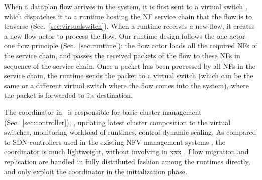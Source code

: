 When a dataplan flow arrives in the system, it is first sent to a virtual switch , which dispatches it to a runtime hosting the NF service chain that the flow is to traverse (Sec.~\ref{sec:virtualswitch}). When a runtime receives a new flow, it creates a new flow actor to process the flow. Our runtime design follows the one-actor-one flow principle (Sec.~\ref{sec:runtime}): the flow actor loads all the required NFs of the service chain, and passes the received packets of the flow to these NFs in sequence of the service chain. Once a packet has been processed by all NFs in the service chain, the runtime sends the packet to a virtual switch (which can be the same or a different virtual switch where the flow comes into the system), where the packet is forwarded to its destination.
 



The coordinator in \nfactor~is responsible for basic cluster management (Sec.~\ref{sec:controller}), \eg, updating latest cluster composition to the virtual switches, monitoring workload of runtimes, control dynamic scaling. %
As compared to SDN controllers used in the existing NFV management systems \cite{}, the coordinator is much lightweight, without involving in xxx . Flow migration and replication are handled in fully distributed fashion among the runtimes directly, and only exploit the coordinator in the initialization phase.

